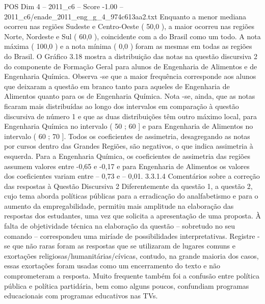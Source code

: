 \begin{textsample}{POS Dim 4 – 2011\_c6 – Score -1.00 – 2011\_c6/enade\_2011\_eng\_g\_4\_974c613aa2.txt}
Enquanto a menor mediana ocorreu nas regiões Sudeste e Centro-Oeste ( 50,0 ), a maior ocorreu nas regiões Norte, Nordeste e Sul ( 60,0 ), coincidente com a do Brasil como um todo.
A nota máxima ( 100,0 ) e a nota mínima ( 0,0 ) foram as mesmas em todas as regiões do Brasil.
O Gráfico 3.18 mostra a distribuição das notas na questão discursiva 2 do componente de Formação Geral para alunos de Engenharia de Alimentos e de Engenharia Química.
Observa -se que a maior frequência corresponde aos alunos que deixaram a questão em branco tanto para aqueles de Engenharia de Alimentos quanto para os de Engenharia Química.
Nota -se, ainda, que as notas ficaram mais distribuídas ao longo dos intervalos em comparação à questão discursiva de número 1 e que as duas distribuições têm outro máximo local, para Engenharia Química no intervalo ( 50 ; 60 ] e para Engenharia de Alimentos no intervalo ( 60 ; 70 ].
Todos os coeficientes de assimetria, desagregando as notas por cursos dentro das Grandes Regiões, são negativos, o que indica assimetria à esquerda.
Para a Engenharia Química, os coeficientes de assimetria das regiões assumem valores entre -0,65 e -0,17 e para Engenharia de Alimentos os valores dos coeficientes variam entre – 0,73 e – 0,01. 3.3.1.4 Comentários sobre a correção das respostas à Questão Discursiva 2 Diferentemente da questão 1, a questão 2, cujo tema aborda políticas públicas para a erradicação do analfabetismo e para o aumento da empregabilidade, permitiu mais amplitude na elaboração das respostas dos estudantes, uma vez que solicita a apresentação de uma proposta.
À falta de objetividade técnica na elaboração da questão – sobretudo no seu comando – correspondeu uma miríade de possibilidades interpretativas.
Registre -se que não raras foram as respostas que se utilizaram de lugares comuns e exortações religiosas/humanitárias/cívicas, contudo, na grande maioria dos casos, essas exortações foram usadas como um encerramento do texto e não comprometeram a resposta.
Muito frequente também foi a confusão entre política pública e política partidária, bem como alguns poucos, confundiam programas educacionais com programas educativos nas TVs.

\end{textsample}
